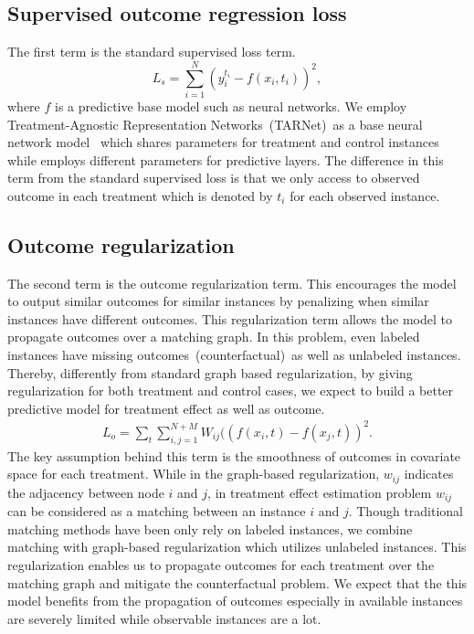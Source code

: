 \subsection{Supervised outcome regression loss}

The first term is the standard supervised loss term. 
\begin{equation}
\label{eq:supervised}
L_s=\sum_{i=1}^{N}(y^{t_i}_i-f(x_i, t_i))^{2},
\end{equation}
where $f$ is a predictive base model such as neural networks. We employ Treatment-Agnostic Representation Networks~(TARNet)~as a base neural network model~\cite{shalit2017estimating} which shares parameters for treatment and control instances while employs different parameters for predictive layers. The difference in this term from the standard supervised loss is that we only access to observed outcome in each treatment which is denoted by $t_i$ for each observed instance. 


\subsection{Outcome regularization}
The second term is the outcome regularization term. This encourages the model to output similar outcomes for similar instances by penalizing when similar instances have different outcomes. This regularization term allows the model to propagate outcomes over a matching graph. In this problem, even labeled instances have missing outcomes~(counterfactual)~as well as unlabeled instances. Thereby, differently from standard graph based regularization, by giving regularization for both treatment and control cases, we expect to build a better predictive model for treatment effect as well as outcome.
\begin{equation}
\label{eq:outcome}
\begin{split}
L_o=\sum_{t}\sum_{i,j=1}^{N+M}W_{ij}((f(x_i, t)-f(x_j, t))^{2}.
\end{split}
\end{equation}
The key assumption behind this term is the smoothness of outcomes in covariate space for each treatment. While in the graph-based regularization, $w_{ij}$ indicates the adjacency between node $i$ and $j$, in treatment effect estimation problem $w_{ij}$ can be considered as a matching between an instance $i$ and $j$. Though traditional matching methods have been only rely on labeled instances, we combine matching with graph-based regularization which utilizes unlabeled instances. This regularization enables us to propagate outcomes for each treatment over the matching graph and mitigate the counterfactual problem. We expect that the this model benefits from the propagation of outcomes especially in available instances are severely limited while observable instances are a lot.

